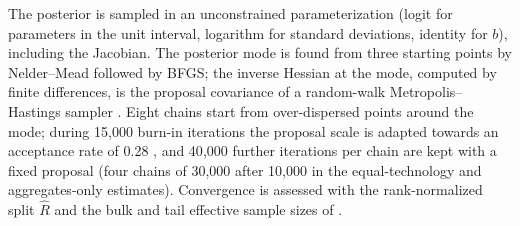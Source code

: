 The posterior is sampled in an unconstrained parameterization (logit for parameters in the unit interval, logarithm for standard deviations, identity for $b$), including the Jacobian. The posterior mode is found from three starting points by Nelder--Mead followed by BFGS; the inverse Hessian at the mode, computed by finite differences, is the proposal covariance of a random-walk Metropolis--Hastings sampler \citep{AnSchorfheide2007}. Eight chains start from over-dispersed points around the mode; during 15{,}000 burn-in iterations the proposal scale is adapted towards an acceptance rate of 0.28 \citep{RobertsGelmanGilks1997}, and 40{,}000 further iterations per chain are kept with a fixed proposal (four chains of 30{,}000 after 10{,}000 in the equal-technology and aggregates-only estimates). Convergence is assessed with the rank-normalized split $\hat R$ and the bulk and tail effective sample sizes of \citet{Vehtari2021}.
